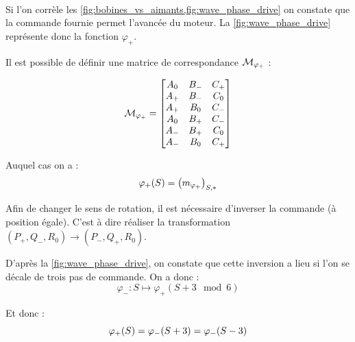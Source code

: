 \paragraph{}

Si l'on corrèle les \cref{fig:bobines_vs_aimants,fig:wave_phase_drive} on constate que la commande fournie permet l'avancée du moteur.
La \cref{fig:wave_phase_drive} représente donc la fonction $\varphi_+$.

Il est possible de définir une matrice de correspondance $\mathcal{M}_{\varphi_{+}}$ :

\[
    \mathcal{M}_{\varphi_{+}} = 
    \begin{bmatrix}
        A_0 & B_- & C_+ \\
        A_+ & B_- & C_0 \\
        A_+ & B_0 & C_- \\
        A_0 & B_+ & C_- \\
        A_- & B_+ & C_0 \\
        A_- & B_0 & C_+ \\
    \end{bmatrix}
\]

Auquel cas on a :
$$\varphi_{+}(S) = \left(m_{\varphi_{+}}\right)_{S,*}$$

Afin de changer le sens de rotation, il est nécessaire d'inverser la commande (à position égale). C'est à dire réaliser la transformation  $(P_+,Q_-,R_0) \to (P_-,Q_+,R_0)$.

D'après la \cref{fig:wave_phase_drive}, on constate que cette inversion a lieu si l'on se décale de trois pas de commande. On a donc :
$$\varphi_- : S \longmapsto \varphi_+(S +3 \mod 6)$$

Et donc :
$$\varphi_{+}(S) = \varphi_{-}(S+3) = \varphi_{-}(S-3)$$